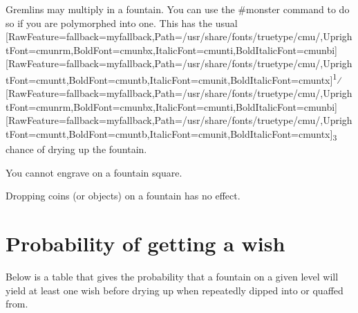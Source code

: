 Gremlins\footnotemark[83] may multiply in a fountain. You can use the \#monster\footnotemark[84] command to do so if you are polymorphed into one. This has the usual \allowbreak{}\setmainfont{cmunrm.ttf}[RawFeature={fallback=myfallback},Path=/usr/share/fonts/truetype/cmu/,UprightFont=cmunrm,BoldFont=cmunbx,ItalicFont=cmunti,BoldItalicFont=cmunbi]\setmonofont{cmunrm.ttf}[RawFeature={fallback=myfallback},Path=/usr/share/fonts/truetype/cmu/,UprightFont=cmuntt,BoldFont=cmuntb,ItalicFont=cmunit,BoldItalicFont=cmuntx]\textsuperscript{1}⁄\allowbreak{}\setmainfont{cmunrm.ttf}[RawFeature={fallback=myfallback},Path=/usr/share/fonts/truetype/cmu/,UprightFont=cmunrm,BoldFont=cmunbx,ItalicFont=cmunti,BoldItalicFont=cmunbi]\setmonofont{cmunrm.ttf}[RawFeature={fallback=myfallback},Path=/usr/share/fonts/truetype/cmu/,UprightFont=cmuntt,BoldFont=cmuntb,ItalicFont=cmunit,BoldItalicFont=cmuntx]\textsubscript{3} chance of drying up the fountain.


You cannot engrave\footnotemark[85] on a fountain square.


Dropping coins (or objects) on a fountain has no effect.



\section{Probability of getting a wish}
\label{7}
Below is a table that gives the probability that a fountain on a given level will yield at least one wish before drying up when repeatedly dipped into or quaffed from.




